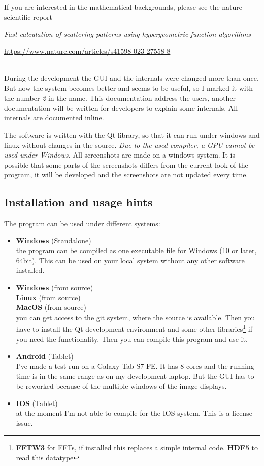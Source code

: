 \documentclass[11pt]{article} %
\begin{document}
If you are interested in the mathematical backgrounds, please see the nature scientific report \\
\centerline{\it Fast calculation of scattering patterns using hypergeometric function algorithms}
\centerline{\url{https://www.nature.com/articles/s41598-023-27558-8}} \\

During the development the GUI and the internals were changed more than once. But now the system becomes better and seems to be useful, so I marked it with the number {\it 2} in the name. This documentation address the users, another documentation will be written for developers to explain some internals. All internals are documented inline.

The software is written with the Qt library, so that it can run under windows and linux without changes in the source. {\it Due to the used compiler, a GPU cannot be used under Windows.} All screenshots are made on a windows system. It is possible that some parts of the screenshots differs from the current look of the program, it will be developed and the screenshots are not updated every time.

\subsection{Installation and usage hints}

The program can be used under different systems:
\begin{itemize}\itemsep0pt
\item {\bf Windows} (Standalone) \\
	the program can be compiled as one executable file for Windows (10 or later, 64bit). This can be used on your local system without any other software installed.
\item {\bf Windows} (from source) \\
	{\bf Linux} (from source) \\
	{\bf MacOS} (from source) \\
	you can get access to the git system, where the source is available. Then you have to install the Qt development environment and some other libraries\footnote{{\bf FFTW3} for FFTs, if installed this replaces a simple internal code. {\bf HDF5} to read this datatype} if you need the functionality. Then you can compile this program and use it.
\item {\bf Android} (Tablet) \\
	I've made a test run on a Galaxy Tab S7 FE. It has 8 cores and the running time is in the same range as on my development laptop. But the GUI has to be reworked because of the multiple windows of the image displays.
\item {\bf IOS} (Tablet) \\
	at the moment I'm not able to compile for the IOS system. This is a license issue.
\end{itemize}
\end{document}
